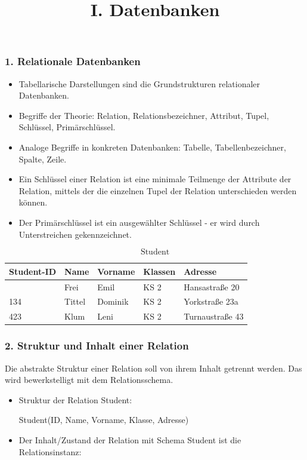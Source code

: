 \documentclass[
  11pt,
  a4paper,
  DIV=11,
  numbers=noendperiod]{scrartcl}
\title{I. Datenbanken}
\author{}
\date{}
\begin{document}
\maketitle


\subsubsection{1. Relationale
Datenbanken}\label{relationale-datenbanken}

\begin{itemize}
\item
  Tabellarische Darstellungen sind die Grundstrukturen relationaler
  Datenbanken.
\item
  Begriffe der Theorie: Relation, Relationsbezeichner, Attribut, Tupel,
  Schlüssel, Primärschlüssel.
\item
  Analoge Begriffe in konkreten Datenbanken: Tabelle,
  Tabellenbezeichner, Spalte, Zeile.
\item
  Ein Schlüssel einer Relation ist eine minimale Teilmenge der Attribute
  der Relation, mittels der die einzelnen Tupel der Relation
  unterschieden werden können.
\item
  Der Primärschlüssel ist ein ausgewählter Schlüssel - er wird durch
  Unterstreichen gekennzeichnet.
\end{itemize}

\[ \text{Student} \]

\begin{longtable}[]{@{}lllll@{}}
\toprule\noalign{}
Student-ID & Name & Vorname & Klassen & Adresse \\
\midrule\noalign{}
\endhead
\bottomrule\noalign{}
\endlastfoot
212 & Frei & Emil & KS 2 & Hansastraße 20 \\
134 & Tittel & Dominik & KS 2 & Yorkstraße 23a \\
423 & Klum & Leni & KS 2 & Turnaustraße 43 \\
\end{longtable}

\subsubsection{2. Struktur und Inhalt einer
Relation}\label{struktur-und-inhalt-einer-relation}

Die abstrakte Struktur einer Relation soll von ihrem Inhalt getrennt
werden. Das wird bewerkstelligt mit dem Relationsschema.

\begin{itemize}
\item
  Struktur der Relation Student:

  Student(ID, Name, Vorname, Klasse, Adresse)
\item
  Der Inhalt/Zustand der Relation mit Schema Student ist die
  Relationsinstanz:
\end{itemize}
\end{document}
